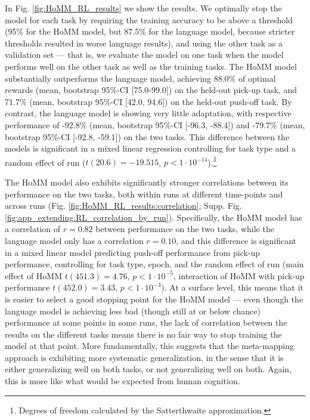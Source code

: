 In Fig. \ref{fig:HoMM_RL_results} we show the results. We optimally stop the model for each task by requiring the training accuracy to be above a threshold (95\% for the HoMM model, but 87.5\% for the language model, because stricter thresholds resulted in worse language results), and using the other task as a validation set --- that is, we evaluate the model on one task when the model performs well on the other task as well as the training tasks. The HoMM model substantially outperforms the language model, achieving 88.0\% of optimal rewards (mean, bootstrap 95\%-CI [75.0-99.0]) on the held-out pick-up task, and 71.7\% (mean, bootstrap 95\%-CI [42.0, 94.6]) on the held-out push-off task. By contrast, the language model is showing very little adaptation, with respective performance of -92.8\% (mean, bootstrap 95\%-CI [-96.3, -88.4]) and -79.7\% (mean, bootstrap 95\%-CI [-92.8, -59.1]) on the two tasks. This difference between the models is significant in a mixed linear regression controlling for task type and a random effect of run (\(t (20.6) = -19.515\), \(p < 1\cdot10^{-14}\)).\footnote{Degrees of freedom calculated by the Satterthwaite approximation.}\par

The HoMM model also exhibits significantly stronger correlations between its performance on the two tasks, both within runs at different time-points and across runs (Fig. \ref{fig:HoMM_RL_results:correlation}, Supp. Fig. \ref{fig:app_extending:RL_correlation_by_run}). Specifically, the HoMM model has a correlation of \(r=0.82\) between performance on the two tasks, while the language model only has a correlation \(r=0.10\), and this difference is significant in a mixed linear model predicting push-off performance from pick-up performance, controlling for task type, epoch, and the random effect of run (main effect of HoMM \(t(451.3) = 4.76\), \(p < 1\cdot 10^{-5}\), interaction of HoMM with pick-up performance \(t(452.0) = 3.43\), \(p < 1 \cdot 10^{-3}\)). At a surface level, this means that it is easier to select a good stopping point for the HoMM model --- even though the language model is achieving less bad (though still at or below chance) performance at some points in some runs, the lack of correlation between the results on the different tasks means there is no fair way to stop training the model at that point. More fundamentally, this suggests that the meta-mapping approach is exhibiting more systematic generalization, in the sense that it is either generalizing well on both tasks, or not generalizing well on both. Again, this is more like what would be expected from human cognition.

